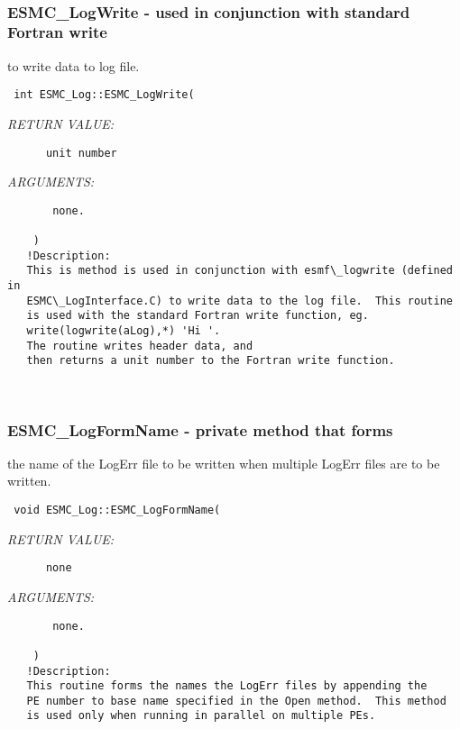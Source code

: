  
\mbox{}\hrulefill\ 
 
\subsubsection [ESMC\_LogWrite] {ESMC\_LogWrite - used in conjunction with standard Fortran write}


   to write data to log file. 
  
\begin{verbatim} int ESMC_Log::ESMC_LogWrite(\end{verbatim}{\em RETURN VALUE:}
\begin{verbatim}      unit number \end{verbatim}{\em ARGUMENTS:}
\begin{verbatim}       none.
 
    )
   !Description:
   This is method is used in conjunction with esmf\_logwrite (defined in
   ESMC\_LogInterface.C) to write data to the log file.  This routine
   is used with the standard Fortran write function, eg.
   write(logwrite(aLog),*) 'Hi '. 
   The routine writes header data, and
   then returns a unit number to the Fortran write function.\end{verbatim}
 
 
\mbox{}\hrulefill\ 
 
\subsubsection [ESMC\_LogFormName] {ESMC\_LogFormName - private method that forms}


    the name of the LogErr file to be written when multiple LogErr
    files are to be written.
  
\begin{verbatim} 
 void ESMC_Log::ESMC_LogFormName(
 \end{verbatim}{\em RETURN VALUE:}
\begin{verbatim}      none\end{verbatim}{\em ARGUMENTS:}
\begin{verbatim}       none.
 
    )
   !Description:
   This routine forms the names the LogErr files by appending the
   PE number to base name specified in the Open method.  This method
   is used only when running in parallel on multiple PEs.\end{verbatim}
 
